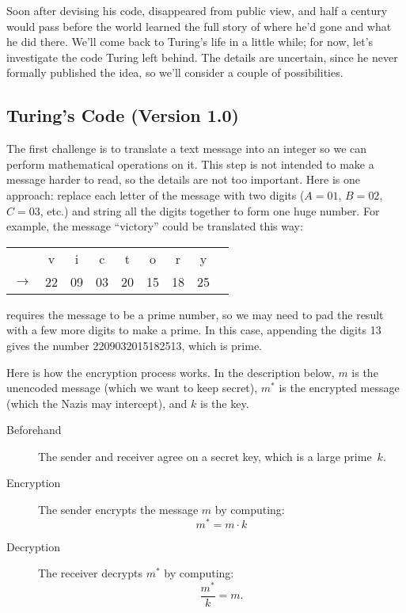 Soon after devising his code,  disappeared from public view,
and half a century would pass before the world learned the full story of
where he'd gone and what he did there.  We'll come back to Turing's life
in a little while; for now, let's investigate the code Turing left behind.
The details are uncertain, since he never formally published the idea, so
we'll consider a couple of possibilities.

\subsection{Turing's Code (Version 1.0)}

The first challenge is to translate a text message into an integer so
we can perform mathematical operations on it.  This step is not
intended to make a message harder to read, so the details are not too
important.  Here is one approach: replace each letter of the message
with two digits ($A = 01$, $B = 02$, $C = 03$, etc.) and string all
the digits together to form one huge number.  For example, the message
``victory'' could be translated this way:
%
\begin{center}
\begin{tabular}{ccccccccc}
   &v &  i &  c &  t & o & r & y \\
$\rightarrow$ & 22 & 09 & 03 & 20 & 15 & 18 & 25
\end{tabular}
\end{center}
%
 requires the message to be a prime number, so we may
need to pad the result with a few more digits to make a prime.  In
this case, appending the digits 13 gives the number 2209032015182513,
which is prime.

Here is how the encryption process works.  In the description
below, $m$ is the unencoded message (which we want to keep secret),
$m^*$ is the encrypted message (which the Nazis may intercept), and
$k$ is the key.

\begin{description}

\item[Beforehand] The sender and receiver agree on a secret key, which
is a large prime~$k$.

\item[Encryption] The sender encrypts the message $m$ by computing:
\[
m^* = m \cdot k
\]

\item[Decryption] The receiver decrypts $m^*$ by computing:
\[
\frac{m^*}{k}
\iffalse
= \frac{m \cdot k}{k}
\fi
  = m.
\]

\end{description}


